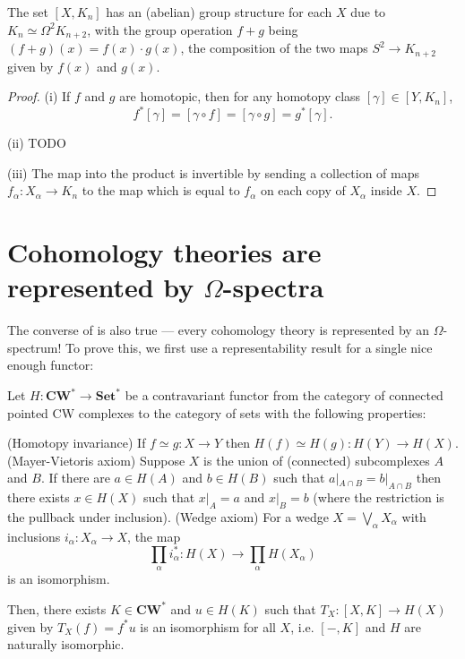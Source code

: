 \documentclass[10pt]{article}
\begin{document}
\begin{remark}
    The set $[X,K_n]$ has an (abelian) group structure
    for each $X$ due to $K_n \simeq \Omega^2 K_{n+2}$,
    with the group operation $f+g$ being
    $(f+g)(x) = f(x)\cdot g(x)$,
    the composition of the two maps $S^2\to K_{n+2}$
    given by $f(x)$ and $g(x)$.
\end{remark}

\begin{proof}
    (i) If $f$ and $g$ are homotopic,
    then for any homotopy class $[\gamma]\in [Y,K_n]$,
    \begin{equation*}
	f^*[\gamma] = [\gamma\circ f] = [\gamma\circ g] = g^*[\gamma].
    \end{equation*}

    (ii) TODO

    (iii) The map into the product is invertible
    by sending a collection of maps $f_\alpha\colon X_\alpha\to K_n$
    to the map which is equal to $f_\alpha$ on
    each copy of $X_\alpha$ inside $X$.
\end{proof}

\section{Cohomology theories are represented by $\Omega$-spectra}

The converse of  is also true ---
every cohomology theory is represented by an $\Omega$-spectrum!
To prove this, we first use a representability result
for a single nice enough functor:
\begin{theorem}
    \label{thm:brown-representability}
    Let $H\colon\mathbf{CW}^*\to\mathbf{Set}^*$ be a
    contravariant functor from
    the category of connected pointed CW complexes to
    the category of sets with the following properties:
    \begin{enumerate}[(i)]
        \ii (Homotopy invariance) If $f\simeq g\colon X\to Y$ then
	$H(f)\simeq H(g)\colon H(Y)\to H(X)$.
	\ii (Mayer-Vietoris axiom) Suppose $X$ is
	the union of (connected) subcomplexes $A$ and $B$.
	If there are $a\in H(A)$ and $b\in H(B)$ such that
	$a|_{A\cap B} = b|_{A\cap B}$ then
	there exists $x\in H(X)$ such that $x|_A = a$ and $x|_B = b$
	(where the restriction is the pullback under inclusion).
	\ii (Wedge axiom) For a wedge $X = \bigvee_\alpha X_\alpha$
	with inclusions $i_\alpha\colon X_\alpha\to X$, the map
	\begin{equation*}
	    \prod_\alpha i_\alpha^*\colon H(X)\to\prod_\alpha H(X_\alpha)
	\end{equation*}
	is an isomorphism.
    \end{enumerate}
    Then, there exists $K\in\mathbf{CW}^*$ and $u\in H(K)$
    such that $T_X\colon[X,K]\to H(X)$ given by $T_X(f) = f^*u$
    is an isomorphism for all $X$, i.e.
    $[-,K]$ and $H$ are naturally isomorphic.
\end{theorem}
\end{document}
